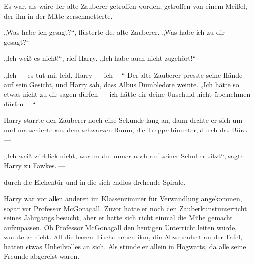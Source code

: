 Es war, als wäre der alte Zauberer getroffen worden, getroffen von einem Meißel, der ihn in der Mitte zerschmetterte.

„Was habe ich gesagt?“, flüsterte der alte Zauberer.
„Was habe ich zu dir gesagt?“

„Ich weiß es nicht!“, rief Harry.
„Ich habe auch nicht zugehört!“

„Ich — es tut mir leid, Harry — ich —“
Der alte Zauberer presste seine Hände auf sein Gesicht, und Harry sah, dass Albus Dumbledore weinte.
„Ich hätte so etwas nicht zu dir sagen dürfen — ich hätte dir deine Unschuld nicht übelnehmen dürfen —“

Harry starrte den Zauberer noch eine Sekunde lang an, dann drehte er sich um und marschierte aus dem schwarzen Raum, die Treppe hinunter, durch das Büro —

„Ich weiß wirklich nicht, warum du immer noch auf seiner Schulter sitzt“, sagte Harry zu Fawkes. —

durch die Eichentür und in die sich endlos drehende Spirale.

\later

Harry war vor allen anderen im Klassenzimmer für Verwandlung angekommen, sogar vor Professor McGonagall. Zuvor hatte er noch den Zauberkunstunterricht seines Jahrgangs besucht, aber er hatte sich nicht einmal die Mühe gemacht aufzupassen. Ob Professor McGonagall den heutigen Unterricht leiten würde, wusste er nicht.
All die leeren Tische neben ihm, die Abwesenheit an der Tafel, hatten etwas Unheilvolles an sich. Als stünde er allein in Hogwarts, da alle seine Freunde abgereist waren.

